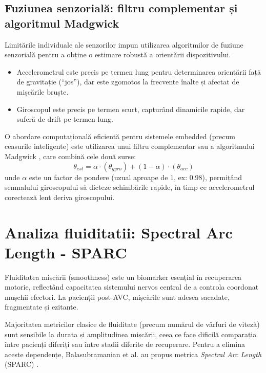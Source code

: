 \subsection{Fuziunea senzorială: filtru complementar și algoritmul Madgwick}
\hspace{0.75cm}Limitările individuale ale senzorilor impun utilizarea algoritmilor de fuziune senzorială pentru a obține o estimare robustă a orientării dispozitivului. 
\begin{itemize}
    \item Accelerometrul este precis pe termen lung pentru determinarea orientării față de gravitație (“jos”), dar este zgomotos la frecvențe înalte și afectat de mișcările bruște.
    \item Giroscopul este precis pe termen scurt, capturând dinamicile rapide, dar suferă de drift pe termen lung.
\end{itemize}

O abordare computațională eficientă pentru sistemele embedded (precum ceasurile inteligente) este utilizarea unui filtru complementar 
sau a algoritmului Madgwick \cite{madgwick_2011}, care combină cele două surse:
\begin{equation}
    \theta_{est} = \alpha \cdot (\theta_{gyro}) + (1 - \alpha) \cdot (\theta_{acc})
\end{equation}
unde $\alpha$ este un factor de pondere (uzual aproape de 1, ex: 0.98), permițând semnalului giroscopului să dicteze schimbările rapide, 
în timp ce accelerometrul corectează lent deriva giroscopului.

\section{Analiza fluiditatii: Spectral Arc Length - SPARC}
\hspace{0.75cm}Fluiditatea mișcării (smoothness) este un biomarker esențial în recuperarea motorie, reflectând capacitatea sistemului nervos central de a controla coordonat mușchii efectori. La pacienții post-AVC, mișcările sunt adesea sacadate, fragmentate și ezitante.

Majoritatea metricilor clasice de fluiditate (precum numărul de vârfuri de viteză) sunt sensibile la durata și amplitudinea mișcării, ceea ce face dificilă comparația între pacienți diferiți sau între stadii diferite de recuperare. Pentru a elimina aceste dependențe, Balasubramanian et al. au propus metrica \textit{Spectral Arc Length} (SPARC) \cite{balasubramanian_2015}.

